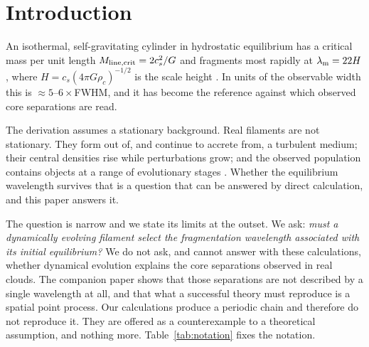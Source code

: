 \documentclass[usenatbib,twoside,twocolumn]{mnras}
\begin{document}
\section{Introduction}
\label{sec:intro}

An isothermal, self-gravitating cylinder in hydrostatic equilibrium has a critical mass per unit length $M_{\rm line,crit}=2c_s^2/G$ \citep{Ostriker1964} and fragments most rapidly at $\lambda_{\rm m}=22H$, where $H=c_s(4\pi G\rho_c)^{-1/2}$ is the scale height \citep{Inutsuka1992,Nagasawa1987,Fischera2012}. In units of the observable width this is $\approx5$--$6\times$FWHM, and it has become the reference against which observed core separations are read.

The derivation assumes a stationary background. Real filaments are not stationary. They form out of, and continue to accrete from, a turbulent medium; their central densities rise while perturbations grow; and the observed population contains objects at a range of evolutionary stages \citep{Andre2014,Clarke2016,Clarke2017,Clarke2020}. Whether the equilibrium wavelength survives that is a question that can be answered by direct calculation, and this paper answers it.

The question is narrow and we state its limits at the outset. We ask: \emph{must a dynamically evolving filament select the fragmentation wavelength associated with its initial equilibrium?} We do not ask, and cannot answer with these calculations, whether dynamical evolution explains the core separations observed in real clouds. The companion paper shows that those separations are not described by a single wavelength at all, and that what a successful theory must reproduce is a spatial point process. Our calculations produce a periodic chain and therefore do not reproduce it. They are offered as a counterexample to a theoretical assumption, and nothing more. Table~\ref{tab:notation} fixes the notation.
\end{document}
